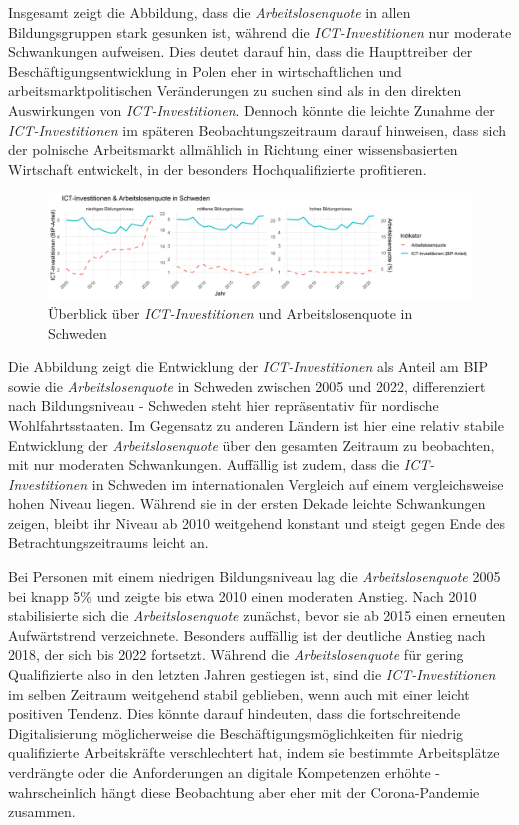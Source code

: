 Insgesamt zeigt die Abbildung, dass die \textit{Arbeitslosenquote} in allen 
Bildungsgruppen stark gesunken ist, während die \textit{\ac{ICT}-Investitionen} nur 
moderate Schwankungen aufweisen. Dies deutet darauf hin, dass die Haupttreiber der 
Beschäftigungsentwicklung in Polen eher in wirtschaftlichen und 
arbeitsmarktpolitischen Veränderungen zu suchen sind als in den direkten 
Auswirkungen von \textit{\ac{ICT}-Investitionen}. Dennoch könnte die leichte 
Zunahme der \textit{\ac{ICT}-Investitionen} im späteren Beobachtungszeitraum 
darauf hinweisen, dass sich der polnische Arbeitsmarkt allmählich in Richtung 
einer wissensbasierten Wirtschaft entwickelt, in der besonders Hochqualifizierte 
profitieren.

\begin{figure}[htbp]
    \centering
    \includegraphics[width=\textwidth]{assets/plot_sweden_final.png}
    \caption{Überblick über \textit{\ac{ICT}-Investitionen} und Arbeitslosenquote in 
    Schweden}
    \label{fig:sweden}
\end{figure}

Die Abbildung zeigt die Entwicklung der \textit{\ac{ICT}-Investitionen} als Anteil 
am BIP sowie die \textit{Arbeitslosenquote} in Schweden zwischen 2005 und 2022, 
differenziert nach Bildungsniveau - Schweden steht hier repräsentativ für nordische 
Wohlfahrtsstaaten. Im Gegensatz zu anderen Ländern ist hier eine relativ stabile 
Entwicklung der \textit{Arbeitslosenquote} über den gesamten Zeitraum zu beobachten, mit 
nur moderaten Schwankungen. Auffällig ist zudem, dass die \textit{\ac{ICT}-Investitionen} 
in Schweden im internationalen Vergleich auf einem vergleichsweise hohen Niveau liegen. 
Während sie in der ersten Dekade leichte Schwankungen zeigen, bleibt ihr Niveau ab 
2010 weitgehend konstant und steigt gegen Ende des Betrachtungszeitraums leicht an.

Bei Personen mit einem niedrigen Bildungsniveau lag die \textit{Arbeitslosenquote} 2005 
bei knapp 5\% und zeigte bis etwa 2010 einen moderaten Anstieg. Nach 2010 stabilisierte 
sich die \textit{Arbeitslosenquote} zunächst, bevor sie ab 2015 einen erneuten 
Aufwärtstrend verzeichnete. Besonders auffällig ist der deutliche Anstieg nach 2018, der 
sich bis 2022 fortsetzt. Während die \textit{Arbeitslosenquote} für gering Qualifizierte 
also in den letzten Jahren gestiegen ist, sind die \textit{\ac{ICT}-Investitionen} im 
selben Zeitraum weitgehend stabil geblieben, wenn auch mit einer leicht positiven Tendenz. 
Dies könnte darauf hindeuten, dass die fortschreitende Digitalisierung möglicherweise die 
Beschäftigungsmöglichkeiten für niedrig qualifizierte Arbeitskräfte verschlechtert hat, 
indem sie bestimmte Arbeitsplätze verdrängte oder die Anforderungen an digitale 
Kompetenzen erhöhte - wahrscheinlich hängt diese Beobachtung aber eher mit der 
Corona-Pandemie zusammen.

